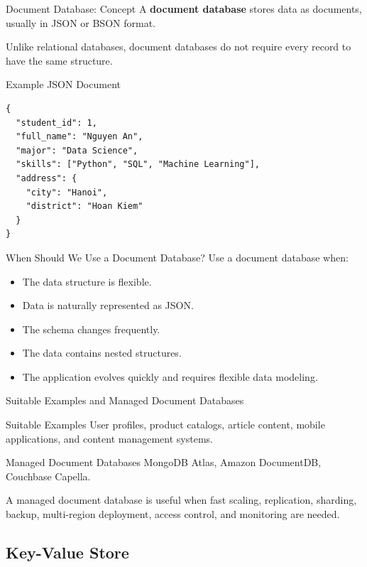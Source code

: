 \documentclass[aspectratio=169,11pt]{beamer}
\newcommand{\keyword}[1]{\textcolor{accent}{\textbf{#1}}}
\newcommand{\kw}[1]{\keyword{#1}}
\newcommand{\smallitem}{\setlength{\itemsep}{2pt}\setlength{\parskip}{0pt}}
\begin{document}
\begin{frame}{Document Database: Concept}
A \kw{document database} stores data as documents, usually in JSON or BSON format.

\vspace{2mm}
Unlike relational databases, document databases do not require every record to have the same structure.
\end{frame}

\begin{frame}[fragile]{Example JSON Document}
\small
\begin{verbatim}
{
  "student_id": 1,
  "full_name": "Nguyen An",
  "major": "Data Science",
  "skills": ["Python", "SQL", "Machine Learning"],
  "address": {
    "city": "Hanoi",
    "district": "Hoan Kiem"
  }
}
\end{verbatim}
\end{frame}

\begin{frame}{When Should We Use a Document Database?}
Use a document database when:
\begin{itemize}
  \smallitem
  \item The data structure is flexible.
  \item Data is naturally represented as JSON.
  \item The schema changes frequently.
  \item The data contains nested structures.
  \item The application evolves quickly and requires flexible data modeling.
\end{itemize}
\end{frame}

\begin{frame}{Suitable Examples and Managed Document Databases}
\begin{block}{Suitable Examples}
User profiles, product catalogs, article content, mobile applications, and content management systems.
\end{block}

\begin{block}{Managed Document Databases}
MongoDB Atlas, Amazon DocumentDB, Couchbase Capella.
\end{block}

A managed document database is useful when fast scaling, replication, sharding, backup, multi-region deployment, access control, and monitoring are needed.
\end{frame}

\subsection{Key-Value Store}
\end{document}
